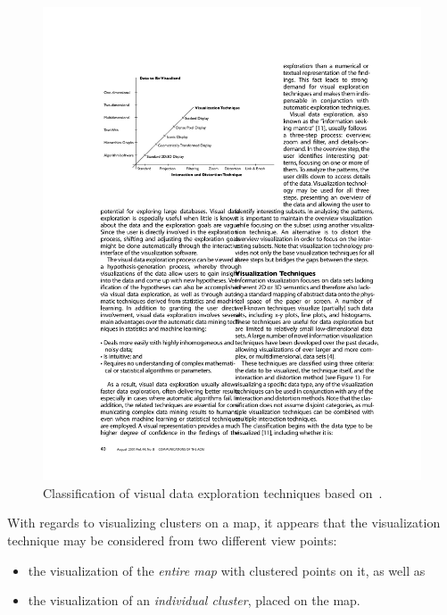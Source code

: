 \begin{figure}[h]
  \begin{center}
    \includegraphics[width=1\textwidth]{figures/classes_visual_techniques.pdf}
    \caption{Classification of visual data exploration techniques based on~\cite{keim2001vis}.}
    \label{fig:visual-techniques}
  \end{center}
\end{figure}


With regards to visualizing clusters on a map, it appears that the visualization technique may be considered from two different view points:

\begin{itemize}

\item the visualization of the \textit{entire map} with clustered points on it, as well as

\item the visualization of an \textit{individual cluster}, placed on the map.

\end{itemize}

